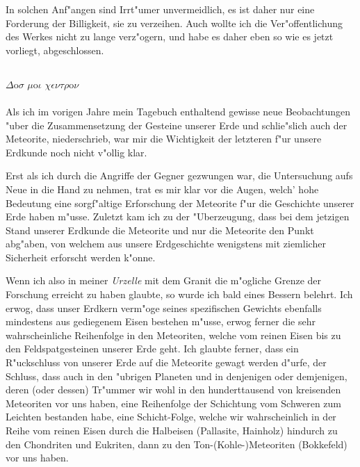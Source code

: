 \documentclass[a4paper, 11pt, oneside]{article}
\begin{document}
In solchen Anf"angen sind Irrt"umer unvermeidlich, es ist daher nur eine Forderung der Billigkeit, sie zu verzeihen. Auch wollte ich die Ver"offentlichung des Werkes nicht zu lange verz"ogern, und habe es daher eben so wie es jetzt vorliegt, abgeschlossen.
\clearpage
\subsection{}
$\Delta$o$\sigma$ $\mu$o$\iota$ $\chi\epsilon\nu\tau\rho$o$\nu$%
\paragraph{}
Als ich im vorigen Jahre mein Tagebuch enthaltend gewisse neue Beobachtungen "uber die Zusammensetzung der Gesteine unserer Erde und schlie"slich auch der Meteorite, niederschrieb, war mir die Wichtigkeit der letzteren f"ur unsere Erdkunde noch nicht v"ollig klar.

Erst als ich durch die Angriffe der Gegner gezwungen war, die Untersuchung aufs Neue in die Hand zu nehmen, trat es mir klar vor die Augen, welch' hohe Bedeutung eine sorgf"altige Erforschung der Meteorite f"ur die Geschichte unserer Erde haben m"usse. Zuletzt kam ich zu der "Uberzeugung, dass bei dem jetzigen Stand unserer Erdkunde die Meteorite und nur die Meteorite den Punkt abg"aben, von welchem aus unsere Erdgeschichte wenigstens mit ziemlicher Sicherheit erforscht werden k"onne.

Wenn ich also in meiner \emph{Urzelle} mit dem Granit die m"ogliche Grenze der Forschung erreicht zu haben glaubte, so wurde ich bald eines Bessern belehrt. Ich erwog, dass unser Erdkern verm"oge seines spezifischen Gewichts ebenfalls mindestens aus gediegenem Eisen bestehen m"usse, erwog ferner die sehr wahrscheinliche Reihenfolge in den Meteoriten, welche vom reinen Eisen bis zu den Feldspatgesteinen unserer Erde geht. Ich glaubte ferner, dass ein R"uckschluss von unserer Erde auf die Meteorite gewagt werden d"urfe, der Schluss, dass auch in den "ubrigen Planeten und in denjenigen oder demjenigen, deren (oder dessen) Tr"ummer wir wohl in den hunderttausend von kreisenden Meteoriten vor uns haben, eine Reihenfolge der Schichtung vom Schweren zum Leichten bestanden habe, eine Schicht-Folge, welche wir wahrscheinlich in der Reihe vom reinen Eisen durch die Halbeisen (Pallasite, Hainholz) hindurch zu den Chondriten und Eukriten, dann zu den Ton-(Kohle-)Meteoriten (Bokkefeld) vor uns haben.
\end{document}
